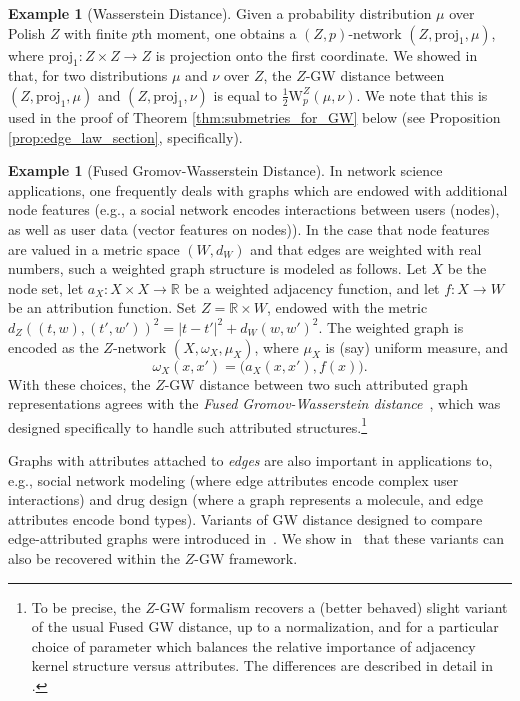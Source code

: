 \documentclass{article}
\theoremstyle{definition}
\newtheorem{example}[proposition]{Example}
\newcommand{\R}{\mathbb{R}}
\newcommand{\wz}{\mathrm{W}_p^Z}
\begin{document}
%
%
%
%
%
%
%
%
%
%
%

%

\begin{example}[Wasserstein Distance]\label{ex:wasserstein_distance}
Given a probability distribution $\mu$ over Polish $Z$ with finite $p$th moment, one obtains a $(Z,p)$-network $(Z,\mathrm{proj}_1,\mu)$, where $\mathrm{proj}_1:Z \times Z \to Z$ is projection onto the first coordinate. We showed in~\cite{bauer2025zgromovwassersteindistance} that, for two distributions $\mu$ and $\nu$ over $Z$, the $Z$-GW distance between $(Z,\mathrm{proj}_1,\mu)$ and $(Z,\mathrm{proj}_1,\nu)$ is equal to $\frac{1}{2} \wz(\mu,\nu)$. We note that this is used in the proof of Theorem \ref{thm:submetries_for_GW} below (see Proposition \ref{prop:edge_law_section}, specifically).
\end{example}

\begin{example}[Fused Gromov-Wasserstein Distance]
In network science applications, one frequently deals with graphs which are endowed with additional node features (e.g., a social network encodes interactions between users (nodes), as well as user data (vector features on nodes)). In the case that node features are valued in a metric space $(W,d_W)$ and that edges are weighted with real numbers, such a weighted graph structure is modeled as follows. Let $X$ be the node set, let $a_X:X \times X \to \R$ be a weighted adjacency function, and let $f:X \to W$ be an attribution function. Set $Z = \R \times W$, endowed with the metric $d_Z((t,w),(t',w'))^2 = |t-t'|^2 + d_W(w,w')^2$. The weighted graph is encoded as the $Z$-network $(X,\omega_X,\mu_X)$, where  $\mu_X$ is (say) uniform measure, and 
\[
\omega_X(x,x') = \big(a_X(x,x'),f(x)\big).
\]
With these choices, the $Z$-GW distance between two such attributed graph representations agrees with the \emph{Fused Gromov-Wasserstein distance}~\cite{Vayer2020FGW}, which was designed specifically to handle such attributed structures.\footnote{To be precise, the $Z$-GW formalism recovers a  (better behaved) slight variant of the usual Fused GW distance, up to a normalization, and for a particular choice of parameter which balances the relative importance of adjacency kernel structure versus attributes. The differences are described in detail in \cite[Section 3.1.2]{bauer2025zgromovwassersteindistance}.} 

Graphs with attributes attached to \emph{edges} are also important in applications to, e.g.,  social network modeling (where edge attributes encode complex user interactions) and drug design (where a graph represents a molecule, and edge attributes encode bond types). Variants of GW distance designed to compare edge-attributed graphs were introduced in~\cite{yang2024exploiting,kawano2024multi}. We show in~\cite{bauer2025zgromovwassersteindistance} that these variants can also be recovered within the $Z$-GW framework.
\end{example}
\end{document}
